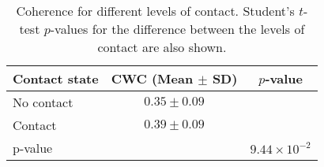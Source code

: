 \begin{table}
\centering
\caption{Coherence for different levels of contact. Student's $t$-test $p$-values for the difference between the levels of contact are also shown.}
\label{tab:coherence_contact}
\begin{tabular}{lcc}
\toprule
Contact state & CWC (Mean $\pm$ SD) & $p$-value \\ 
\midrule
No contact & $0.35 \pm 0.09$ & \\ 
Contact & $0.39 \pm 0.09$ & \\ 
\midrule
p-value & & $9.44 \times 10^{-2}$ \\ 
\bottomrule
\end{tabular}
\end{table}
